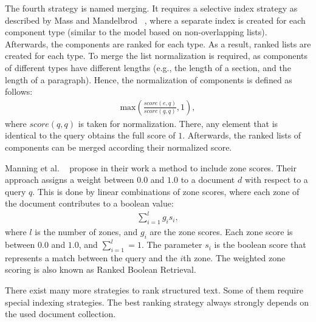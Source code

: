 The fourth strategy is named merging. It requires a selective index strategy as described by Mass and Mandelbrod ~\cite{MassM04}, where a separate index is created for each component type (similar to the model based on non-overlapping lists). Afterwards, the components are ranked for each type. As a result, ranked lists are created for each type. To merge the list normalization is required, as components of different types have different lengths (e.g., the length of a section, and the length of a paragraph). Hence, the normalization of components is defined as follows:
\begin{align}
  \text{max}\left( \frac{\mathit{score}(e, q)}{\mathit{score}(q, q)}, 1 \right),
\end{align}
where $\mathit{score}(q, q)$ is taken for normalization. There, any element that is identical to the query obtains the full score of $1$. Afterwards, the ranked lists of components can be merged according their normalized score.

Manning et al. ~\cite{manning2008} propose in their work a method to include zone scores. Their approach assigns a weight between $0.0$ and $1.0$ to a document $d$ with respect to a query $q$. This is done by linear combinations of zone scores, where each zone of the document contributes to a boolean value:
\begin{align}
  \sum_{i = 1}^{l}g_i s_i,
\end{align}
where $l$ is the number of zones, and $g_i$ are the zone scores. Each zone score is between $0.0$ and $1.0$, and $\sum_{i = 1}^l = 1$. The parameter $s_i$ is the boolean score that represents a match between the query and the $i$th zone. The weighted zone scoring is also known as Ranked Boolean Retrieval. 

There exist many more strategies to rank structured text. Some of them require special indexing strategies. The best ranking strategy always strongly depends on the used document collection.




